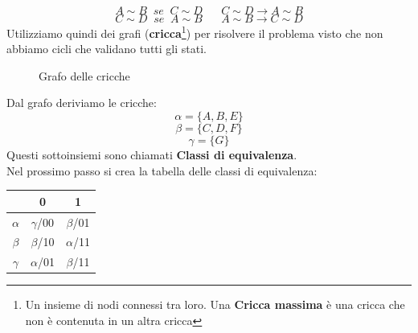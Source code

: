 \documentclass[a4paper]{article}
\theoremstyle{break}
\theoremstyle{break}
\theoremstyle{break}
\theoremstyle{break}
\begin{document}
\begin{example}
    \[
    A \sim B\;\;se\;\; C \sim D\;\;\;\;\;\; C \sim D \to A \sim B
    \] 
    \[
    C \sim D\;\;se\;\; A \sim B\;\;\;\;\;\; A \sim B \to C \sim D
    \] 
    Utilizziamo quindi dei grafi (\textbf{cricca}\footnote{Un insieme di nodi connessi tra loro.
    Una \textbf{Cricca massima} è una cricca che non è contenuta in un altra cricca}) per risolvere il problema visto che non abbiamo cicli che
    validano tutti gli stati.
    \begin{figure}[H]
      \begin{center}
      \end{center}
      \caption{Grafo delle cricche}
    \end{figure}
    Dal grafo deriviamo le cricche:
    \[
    \alpha = \{A,B,E\} 
    \] 
    \[
    \beta = \{C,D,F\}
    \] 
    \[
    \gamma = \{G\}
    \] 
    Questi sottoinsiemi sono chiamati \textbf{Classi di equivalenza}.\\
    Nel prossimo passo si crea la tabella delle classi di equivalenza:
    \begin{table}[H]
      \begin{center}
        \begin{tabular}{c|c|c}
          & 0 & 1 \\
          \hline
          \( \alpha \) & \( \gamma \)/00 & \( \beta \)/01  \\ 
          \( \beta \) & \( \beta \)/10 & \( \alpha \)/11 \\ 
          \( \gamma \) & \( \alpha \)/01 & \( \beta \)/11 \\ 
        \end{tabular}
      \end{center}
    \end{table}
  \end{example}
\end{document}
